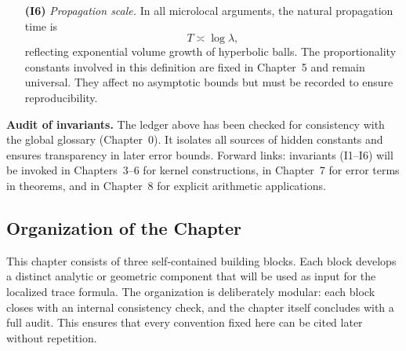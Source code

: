 \begin{itemize}[leftmargin=2em]
  \item[\textbf{(I6)}] \textit{Propagation scale.}  
  In all microlocal arguments, the natural propagation time is
  \[
    T \asymp \log \lambda,
  \]
  reflecting exponential volume growth of hyperbolic balls.  
  The proportionality constants involved in this definition are fixed in Chapter~5
  and remain universal.  
  They affect no asymptotic bounds but must be recorded to ensure reproducibility.

\end{itemize}

\medskip

\noindent
\textbf{Audit of invariants.}  
The ledger above has been checked for consistency with the global glossary
(Chapter~0).  
It isolates all sources of hidden constants and ensures transparency in later
error bounds.  
Forward links: invariants (I1–I6) will be invoked in Chapters~3–6 for kernel
constructions, in Chapter~7 for error terms in theorems, and in Chapter~8
for explicit arithmetic applications.

\subsection*{Organization of the Chapter}

This chapter consists of three self-contained building blocks.  
Each block develops a distinct analytic or geometric component that will be used 
as input for the localized trace formula.  
The organization is deliberately modular: each block closes with an internal consistency check, 
and the chapter itself concludes with a full audit.  
This ensures that every convention fixed here can be cited later without repetition.

